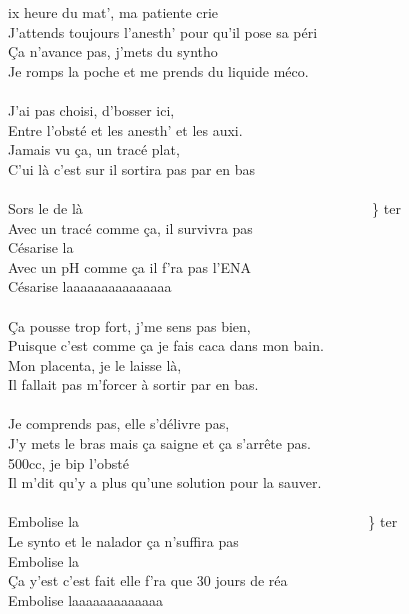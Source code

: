 
ix heure du mat', ma patiente crie
\\J'attends toujours l'anesth' pour qu'il pose sa péri
\\Ça n'avance pas, j'mets du syntho
\\Je romps la poche et me prends du liquide méco.
\\\\J'ai pas choisi, d'bosser ici,
\\Entre l'obsté et les anesth' et les auxi.
\\Jamais vu ça, un tracé plat,
\\C'ui là c'est sur il sortira pas par en bas
\\\\Sors le de là ~~~~~~~~~~~~~~~~~~~~~~~~~~~~~~~~~~~~~~~~ \} ter
\\Avec un tracé comme ça, il survivra pas
\\Césarise la ~~~~~~~~~~~~~~~~~~~~~~~~~~~~~~~~~~~~~~~~~~ \bissimple
\\Avec un pH comme ça il f'ra pas l'ENA
\\Césarise laaaaaaaaaaaaaaa
\\\\Ça pousse trop fort, j'me sens pas bien,
\\Puisque c'est comme ça je fais caca dans mon bain.
\\Mon placenta, je le laisse là,
\\Il fallait pas m'forcer à sortir par en bas.
\\\\Je comprends pas, elle s'délivre pas,
\\J'y mets le bras mais ça saigne et ça s'arrête pas.
\\500cc, je bip l'obsté
\\Il m'dit qu'y a plus qu'une solution pour la sauver.
\\\\Embolise la ~~~~~~~~~~~~~~~~~~~~~~~~~~~~~~~~~~~~~~~~ \} ter
\\Le synto et le nalador ça n'suffira pas
\\Embolise la ~~~~~~~~~~~~~~~~~~~~~~~~~~~~~~~~~~~~~~~~ \bissimple
\\Ça y'est c'est fait elle f'ra que 30 jours de réa
\\Embolise laaaaaaaaaaaaa

\breakpage